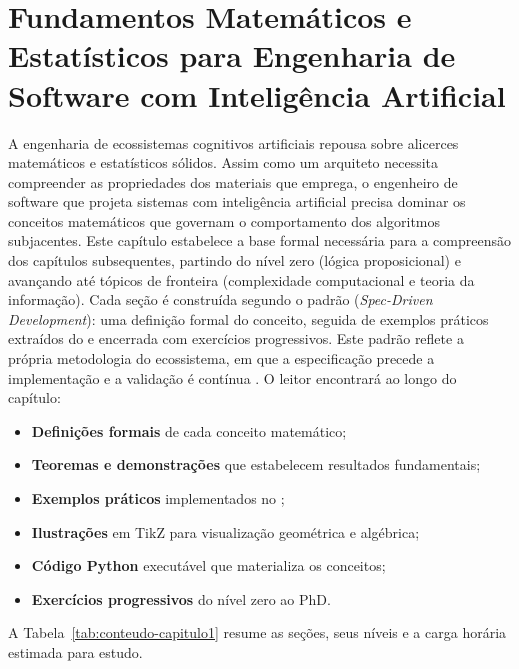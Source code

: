 \chapter{Fundamentos Matemáticos e Estatísticos para Engenharia de Software com Inteligência Artificial}
\label{cap:fundamentos-matematicos}
A engenharia de ecossistemas cognitivos artificiais repousa sobre alicerces
matemáticos e estatísticos sólidos. Assim como um arquiteto necessita
compreender as propriedades dos materiais que emprega, o engenheiro de software
que projeta sistemas com inteligência artificial precisa dominar os conceitos
matemáticos que governam o comportamento dos algoritmos subjacentes.
Este capítulo estabelece a base formal necessária para a compreensão dos
capítulos subsequentes, partindo do nível zero (lógica proposicional) e
avançando até tópicos de fronteira (complexidade computacional e teoria da
informação).
Cada seção é construída segundo o padrão \sdd{} (\textit{Spec-Driven
Development}): uma definição formal do conceito, seguida de exemplos práticos
extraídos do \opencodeeco{} e encerrada com exercícios progressivos.
Este padrão reflete a própria metodologia do ecossistema, em que a
especificação precede a implementação e a validação é contínua
\cite{beck2002tdd, pressman2016engenharia}.
O leitor encontrará ao longo do capítulo:
\begin{itemize}
\item \textbf{Definições formais} de cada conceito matemático;
\item \textbf{Teoremas e demonstrações} que estabelecem resultados
fundamentais;
\item \textbf{Exemplos práticos} implementados no \opencodeeco{};
\item \textbf{Ilustrações} em TikZ para visualização geométrica e
algébrica;
\item \textbf{Código Python} executável que materializa os conceitos;
\item \textbf{Exercícios progressivos} do nível zero ao PhD.
\end{itemize}
A Tabela~\ref{tab:conteudo-capitulo1} resume as seções, seus níveis e a
carga horária estimada para estudo.
